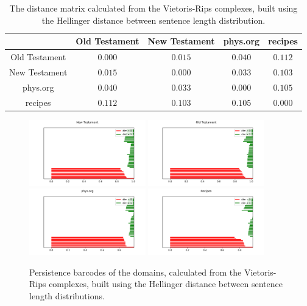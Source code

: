 \documentclass[12pt,a4paper]{amsart}
\begin{document}
\begin{table}
  \centering
  \begin{tabular}{c|cccc}
                  & Old Testament & New Testament & phys.org & recipes \\ \hline
    Old Testament & $0.000$ & $0.015$ & $0.040$ & $0.112$ \\
    New Testament & $0.015$ & $0.000$ & $0.033$ & $0.103$ \\
    phys.org      & $0.040$ & $0.033$ & $0.000$ & $0.105$ \\
    recipes       & $0.112$ & $0.103$ & $0.105$ & $0.000$ \\
  \end{tabular}

  \caption{The distance matrix calculated from the Vietoris-Rips complexes,
    built using the Hellinger distance between sentence length distribution.}
  \label{tab:hell}
\end{table}

\begin{figure}
  \centering
  \includegraphics[width=0.45\textwidth]{../plots/barcodes/bible-new-hell}
  \includegraphics[width=0.45\textwidth]{../plots/barcodes/bible-old-hell}
  \includegraphics[width=0.45\textwidth]{../plots/barcodes/phys-hell}
  \includegraphics[width=0.45\textwidth]{../plots/barcodes/recipes-hell}
  \caption{Persistence barcodes of the domains, calculated from the
    Vietoris-Rips complexes, built using the Hellinger distance between sentence
    length distributions.}
  \label{fig:barcode:hell}
\end{figure}
\end{document}
